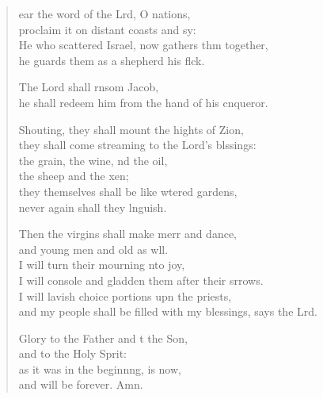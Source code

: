 \settowidth{\versewidth}{and my people shall be filled with my blessings, says the Lord.}
\begin{verse}%
  \begin{patverse}
    ear the word of the Lrd, O nations,\Med\\
proclaim it on distant coasts and sy:\\
He who scattered Israel, now gathers thm together,\Med\\
he guards them as a shepherd his flck.

The Lord shall rnsom Jacob,\Med\\
he shall redeem him from the hand of his cnqueror.

Shouting, they shall mount the hights of Zion,\Med\\
they shall come streaming to the Lord’s blssings:\\
the grain, the wine, nd the oil,\Med\\
the sheep and the xen;\\
they themselves shall be like wtered gardens,\Med\\
never again shall they lnguish.

Then the virgins shall make merr and dance,\Med\\
and young men and old as wll.\\
I will turn their mourning \pointup{\i}nto joy,\Med\\
I will console and gladden them after their srrows.\\
I will lavish choice portions upn the priests,\Med\\
and my people shall be filled with my blessings, says the Lrd.

Glory to the Father and t the Son,\Med\\
and to the Holy Sp\pointup{\i}rit:\\
as it was in the beginn\pointup{\i}ng, is now,\Med\\
and will be forever. Amn. 
  \end{patverse}
\end{verse}

